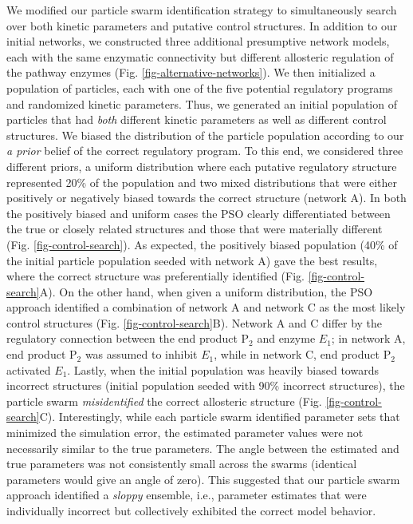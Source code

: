 \documentclass[12pt]{article}
\begin{document}
We modified our particle swarm identification strategy to simultaneously search over both kinetic parameters and putative control structures. 
In addition to our initial networks, we constructed three additional presumptive network models, each with the same enzymatic connectivity but different allosteric regulation of the pathway enzymes (Fig. \ref{fig-alternative-networks}). 
We then initialized a population of particles, each with one of the five potential regulatory programs and randomized kinetic parameters. 
Thus, we generated an initial population of particles that had \textit{both} different kinetic parameters as well as different control structures. 
We biased the distribution of the particle population according to our \textit{a prior} belief of the correct regulatory program. 
To this end, we considered three different priors, a uniform distribution where each putative regulatory structure represented 20\% of the population and two mixed distributions that were either positively or negatively biased towards the correct structure (network A). 
In both the positively biased and uniform cases the PSO clearly differentiated between the true or closely related structures and those that were materially different (Fig. \ref{fig-control-search}). 
As expected, the positively biased population (40\% of the initial particle population seeded with network A) gave the best results, where the correct structure was preferentially identified (Fig. \ref{fig-control-search}A). 
On the other hand, when given a uniform distribution, the PSO approach identified a combination of network A and network C as the most likely control structures (Fig. \ref{fig-control-search}B). 
Network A and C differ by the regulatory connection between the end product P$_2$ and enzyme $E_{1}$; in network A, end product P$_{2}$ was assumed to inhibit $E_{1}$, while in network C, end product P$_{2}$ activated $E_{1}$.  
Lastly, when the initial population was heavily biased towards incorrect structures (initial population seeded with 90\% incorrect structures), the particle swarm \textit{misidentified} the correct allosteric structure (Fig. \ref{fig-control-search}C). Interestingly, while each particle swarm identified parameter sets that minimized the simulation error, the estimated parameter values were not necessarily similar to the true parameters. 
The angle between the estimated and true parameters was not consistently small across the swarms (identical parameters would give an angle of zero). 
This suggested that our particle swarm approach identified a \textit{sloppy} ensemble, i.e., parameter estimates that were individually incorrect but collectively exhibited the correct model behavior.  
\end{document}

